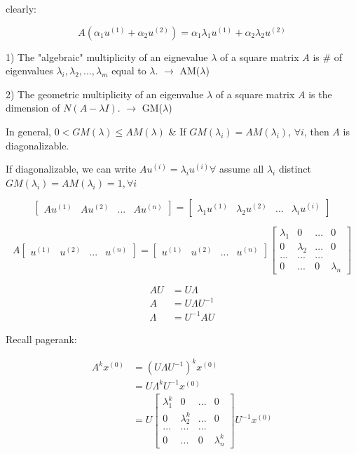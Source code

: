 clearly:

\begin{equation*}
A(\alpha_1u^{(1)} + \alpha_2u^{(2)}) = \alpha_1\lambda_1u^{(1)} + \alpha_2\lambda_2u^{(2)}
\end{equation*}

1) The "algebraic" multiplicity of an eignevalue $\lambda$ of a square matrix $A$ is \# of eigenvalues $\lambda_i, \lambda_2,...,\lambda_m$ equal to $\lambda$. $\rightarrow$ AM($\lambda$)

2) The geometric multiplicity of an eigenvalue $\lambda$ of a square matrix $A$ is the dimension of $N(A - \lambda I)$. $\rightarrow$ GM($\lambda$)

In general, $0 < GM(\lambda) \leq AM(\lambda)$ \& If $GM(\lambda_i) = AM(\lambda_i)$, $\forall i$, then $A$ is diagonalizable. 


If diagonalizable, we can write $Au^{(i)} = \lambda_iu^{(i)} \forall$ assume all $\lambda_i$ distinct $GM(\lambda_i) = AM(\lambda_i) = 1, \forall i$

$$
\left[
\begin{matrix}
Au^{(1)} & Au^{(2)} &... &Au^{(n)} 
\end{matrix}
\right] =
\left[
\begin{matrix}
\lambda_1u^{(1)} & \lambda_2u^{(2)}&... &\lambda_iu^{(i)}
\end{matrix}
\right]
$$

$$A
\left[
\begin{matrix}
u^{(1)} & u^{(2)} &... &u^{(n)} 
\end{matrix}
\right] =
\left[
\begin{matrix}
u^{(1)} & u^{(2)} &... &u^{(n)}
\end{matrix}
\right]
\left[
\begin{matrix}
\lambda_1 & 0 & ... & 0\\
0& \lambda_2  &  ... & 0\\
...  & ...  &   ...& \\
0    &  ... &  0 & \lambda_n
\end{matrix}
\right]
$$



\begin{align*}
AU &= U\Lambda\\
A &= U\Lambda U^{-1}\\
\Lambda &= U^{-1}AU
\end{align*}

Recall pagerank:

\begin{align*}
A^kx^{(0)} &= (U\Lambda U^{-1})^kx^{(0)}\\
&=U\Lambda^kU^{-1}x^{(0)} \\
&= U
\begin{bmatrix}
\lambda_1^k & 0 & ... & 0\\
0& \lambda_2^k  &  ... & 0\\
...  & ...  &   ...& \\
0    &  ... &  0 & \lambda_n^k
\end{bmatrix} U^{-1}x^{(0)}
\end{align*}

